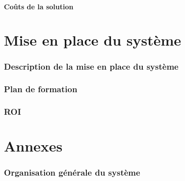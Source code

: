 \documentclass[a4paper]{article}
\begin{document}
\subsection{Coûts de la solution}

\part{Mise en place du système}

\section{Description de la mise en place du système}

\section{Plan de formation}

\section{ROI}

\part{Annexes}

\section{Organisation générale du système}
\end{document}

